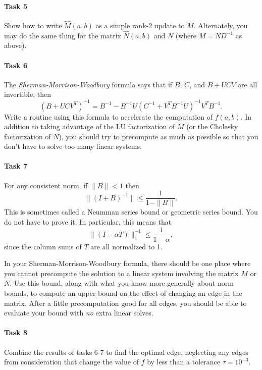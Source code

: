 \documentclass[12pt, leqno]{article}
\begin{document}
\paragraph*{Task 5}
Show how to write $\hat{M}(a,b)$ as a simple rank-2 update to $M$.
Alternately, you may do the same thing for the matrix $\hat{N}(a,b)$
and $N$ (where $M = ND^{-1}$ as above).

\paragraph*{Task 6}
The {\em Sherman-Morrison-Woodbury} formula says that if $B$, $C$, and
$B+UCV$ are all invertible, then
\[
  (B + UCV^T)^{-1} = B^{-1} - B^{-1} U (C^{-1} + V^T B^{-1} U)^{-1} V^T B^{-1}.
\]
Write a routine using this formula
to accelerate the computation of $f(a,b)$.  In addition to taking
advantage of the LU factorization of $M$ (or the Cholesky
factorization of $N$), you should try to precompute as much as
possible so that you don't have to solve too many linear systems.

\paragraph*{Task 7}
For any consistent norm, if $\|B\| < 1$ then
\[
  \|(I+B)^{-1}\| \leq \frac{1}{1-\|B\|}.
\]
This is sometimes called a Neumman series bound or geometric series
bound.  You do not have to prove it.  In particular, this means that
\[
  \|(I-\alpha T)\|_{1}^{-1} \leq \frac{1}{1-\alpha},
\]
since the column sums of $T$ are all normalized to 1.

In your Sherman-Morrison-Woodbury formula, there should be one place
where you cannot precompute the solution to a linear system involving
the matrix $M$ or $N$.  Use this bound, along with what you know more
generally about norm bounds, to compute an upper bound on the effect
of changing an edge in the matrix.  After a little precomputation good
for all edges, you should be able to evaluate your bound with {\em no}
extra linear solves.

\paragraph*{Task 8}
Combine the results of tasks 6-7 to find the optimal edge, neglecting
any edges from consideration that change the value of $f$ by less than
a tolerance $\tau = 10^{-3}$.
\end{document}
